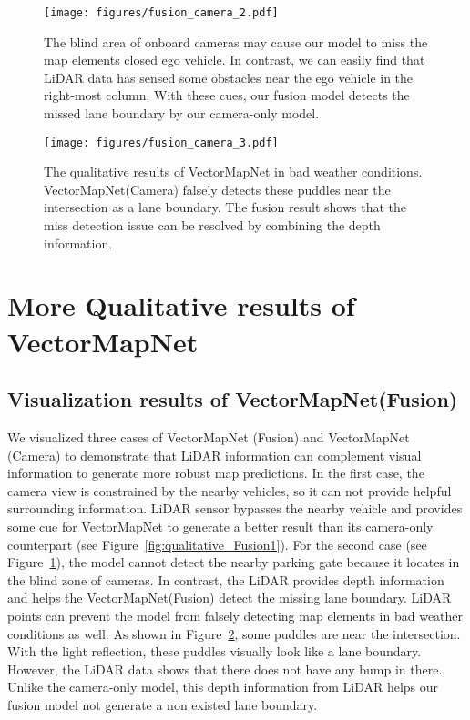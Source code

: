 \documentclass{article}
\theoremstyle{plain}
\theoremstyle{definition}
\theoremstyle{remark}
\begin{document}
\begin{figure}[t]
  \centering
  \texttt{[image: figures/fusion\_camera\_2.pdf]}
  \caption{The blind area of onboard cameras may cause our model to miss the map elements closed ego vehicle. In contrast, we can easily find that LiDAR data has sensed some obstacles near the ego vehicle in the right-most column. With these cues, our fusion model detects the missed lane boundary by our camera-only model.}
  \label{fig:qualitative_Fusion2}
\end{figure}

\begin{figure}[t]
  \centering
  \texttt{[image: figures/fusion\_camera\_3.pdf]}
  \caption{The qualitative results of VectorMapNet in bad weather conditions. VectorMapNet(Camera) falsely detects these puddles near the intersection as a lane boundary. The fusion result shows that the miss detection issue can be resolved by combining the depth information.}
  \label{fig:qualitative_Fusion3}
\end{figure}

\section{More Qualitative results of VectorMapNet}
\label{sec:additional_qualitative}


\subsection{Visualization results of VectorMapNet(Fusion)}
We visualized three cases of VectorMapNet (Fusion) and VectorMapNet (Camera) to demonstrate that LiDAR information can complement visual information to generate more robust map predictions.
In the first case, the camera view is constrained by the nearby vehicles, so it can not provide helpful surrounding information. LiDAR sensor bypasses the nearby vehicle and provides some cue for VectorMapNet to generate a better result than its camera-only counterpart (see Figure~\ref{fig:qualitative_Fusion1}). 
For the second case (see Figure~\ref{fig:qualitative_Fusion2}), the model cannot detect the nearby parking gate because it locates in the blind zone of cameras. In contrast, the LiDAR provides depth information and helps the VectorMapNet(Fusion) detect the missing lane boundary. 
LiDAR points can prevent the model from falsely detecting map elements in bad weather conditions as well. As shown in Figure~\ref{fig:qualitative_Fusion3}, some puddles are near the intersection. With the light reflection, these puddles visually look like a lane boundary. However, the LiDAR data shows that there does not have any bump in there. Unlike the camera-only model, this depth information from LiDAR helps our fusion model not generate a non existed lane boundary. 
\end{document}
